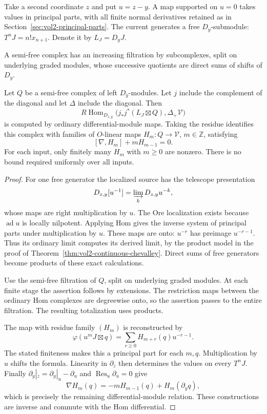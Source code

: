 Take a second coordinate $z$ and put $u=z-y$. A map supported on $u=0$
takes values in principal parts, with all finite normal derivatives
retained as in Section~\ref{sec:vol2-principal-parts}. The current
generates a free $D_y$-submodule: $T^nJ=n!x_{n+1}$. Denote it by
$L_J=D_yJ$.

A semi-free complex has an increasing filtration by subcomplexes,
split on underlying graded modules, whose successive quotients
are direct sums of shifts of $D_y$.

\begin{lemma}
\label{lem:vol2-laurent-current}
Let $Q$ be a semi-free complex of left $D_y$-modules. Let $j$ include
the complement of the diagonal and let $\Delta$ include the diagonal.
Then
\[
 R\operatorname{Hom}_{D_{z,y}}
   \bigl(j_*j^*(L_J\boxtimes Q),\Delta_+\mathcal V\bigr)
\]
is computed by ordinary differential-module maps. Taking the residue
identifies this complex with families of $O$-linear maps
$H_m:Q\to\mathcal V$, $m\in\mathbb Z$, satisfying
\begin{equation}\label{eq:vol2-laurent-horizontal}
 [\nabla,H_m]+mH_{m-1}=0.
\end{equation}
For each input, only finitely many $H_m$ with $m\geq0$ are nonzero.
There is no bound required uniformly over all inputs.
\end{lemma}
\begin{proof}
For one free generator the localized source has the telescope
presentation
\[
 D_{z,y}[u^{-1}]=\varinjlim_k D_{z,y}u^{-k},
\]
whose maps are right multiplication by $u$. The Ore localization
exists because $\operatorname{ad}u$ is locally nilpotent. Applying
Hom gives the inverse system of principal parts under multiplication
by $u$. These maps are onto: $u^{-r}$ has preimage $u^{-r-1}$.
Thus its ordinary limit computes its derived limit, by the product
model in the proof of Theorem~\ref{thm:vol2-continuous-chevalley}. Direct sums of
free generators become products of these exact calculations.

Use the semi-free filtration of $Q$, split on underlying graded
modules. At each finite stage the assertion follows by extensions.
The restriction maps between the ordinary Hom complexes are
degreewise onto, so the assertion passes to the entire filtration.
The resulting totalization uses products.

The map with residue family $(H_m)$ is reconstructed by
\begin{equation}\label{eq:vol2-laurent-reconstruction}
 \varphi(u^mJ\boxtimes q)
   =\sum_{r\geq0}H_{m+r}(q)u^{-r-1}.
\end{equation}
The stated finiteness makes this a principal part for each $m,q$.
Multiplication by $u$ shifts the formula. Linearity in $\partial_z$
then determines the values on every $T^nJ$. Finally
$\partial_y|_z=\partial_y|_u-\partial_u$ and
$\operatorname{Res}_u\partial_u=0$ give
\[
 \nabla H_m(q)=-mH_{m-1}(q)+H_m(\partial_yq),
\]
which is precisely the remaining differential-module relation.
These constructions are inverse and commute with the Hom differential.
\end{proof}


